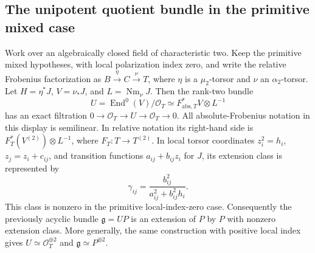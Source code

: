 \subsection{The unipotent quotient bundle in the primitive mixed case}

\begin{lemma}
\label{lem:DE-A3-primitive-unipotent-candidate}
Work over an algebraically closed field of characteristic two. Keep the
primitive mixed hypotheses, with local polarization index zero,
and write the relative Frobenius factorization as
\(B\xrightarrow{\eta}C\xrightarrow{\nu}T\), where \(\eta\) is a
\(\mu _2\)-torsor and \(\nu\) an \(\alpha _2\)-torsor. Let
\(H=\eta^*J\), \(V=\nu_*J\), and \(L=\operatorname{Nm}_\nu J\).
Then the rank-two bundle
\[
 U=\operatorname{End}^0(V)/\mathcal O_T
   \simeq F_{\mathrm{abs},T}^*V\otimes L^{-1}
\]
has an exact filtration \(0\to\mathcal O_T\to U\to\mathcal O_T\to0\).
All absolute-Frobenius notation in this display is semilinear. In relative
notation its right-hand side is \(F_T^*(V^{(2)})\otimes L^{-1}\), where
\(F_T:T\to T^{(2)}\).
In local torsor coordinates \(z_i^2=h_i\), \(z_j=z_i+c_{ij}\), and
transition functions \(a_{ij}+b_{ij}z_i\) for \(J\), its extension class
is represented by
\[
 \gamma_{ij}=\frac{b_{ij}^{2}}{a_{ij}^{2}+b_{ij}^{2}h_i}.
 \tag{DE-UB1}
\]
This class is nonzero in the primitive local-index-zero case.
Consequently the previously acyclic bundle \(\mathfrak g=UP\) is an
extension of \(P\) by \(P\) with nonzero extension class.
More generally, the same construction with positive local index gives
\(U\simeq\mathcal O_T^{\oplus2}\) and
\(\mathfrak g\simeq P^{\oplus2}\).
\end{lemma}

